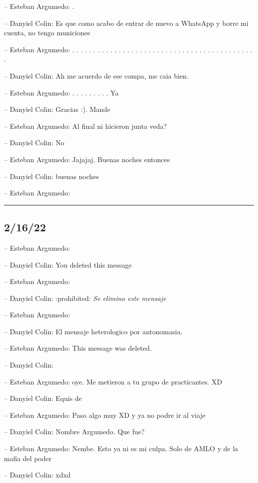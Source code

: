 -- Esteban Argumedo: .

-- Danyiel Colin: Es que como acabo de entrar de nuevo a WhatsApp y
borre mi cuenta, no tengo municiones

-- Esteban Argumedo: . . . . . . . . . . . . . . . . . . . . . . . . . .
. . . . . . . . . . . . . . . . . .

-- Danyiel Colin: Ah me acuerdo de ese compa, me caia bien.

-- Esteban Argumedo: . . . . . . . . . Ya

-- Danyiel Colin: Gracias :). Mande

-- Esteban Argumedo: Al final ni hicieron junta veda?

-- Danyiel Colin: No

-- Esteban Argumedo: Jajajaj. Buenas noches entonces

-- Danyiel Colin: buenas noches

-- Esteban Argumedo:

\begin{center}\rule{0.5\linewidth}{0.5pt}\end{center}

\hypertarget{section-8}{%
\subsection{2/16/22}\label{section-8}}

-- Esteban Argumedo:

-- Danyiel Colin: You deleted this message

-- Esteban Argumedo:

-- Danyiel Colin: :prohibited: \emph{Se elimino este mensaje}

-- Esteban Argumedo:

-- Danyiel Colin: El mensaje heterologico por antonomasia.

-- Esteban Argumedo: This message was deleted.

-- Danyiel Colin:

-- Esteban Argumedo: oye. Me metieron a tu grupo de practicantes. XD

-- Danyiel Colin: Equis de

-- Esteban Argumedo: Paso algo muy XD y ya no podre ir al viaje

-- Danyiel Colin: Nombre Argumedo. Que fue?

-- Esteban Argumedo: Nembe. Esto ya ni es mi culpa. Solo de AMLO y de la
mafia del poder

-- Danyiel Colin: xdxd

